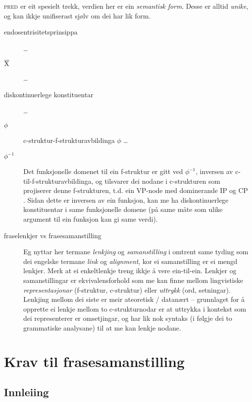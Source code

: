 \documentclass[11pt,a4paper,oneside,draft]{book}
\newcommand{\xbar}{$\rm\overline{X}$}
\newcommand{\F}[2]{\textsc{#1}\ensuremath{_{#2}}}
\newcommand{\PRED}{\F{pred}{}}
\begin{document}
 \PRED{} er eit spesielt trekk, verdien her er ein \emph{semantisk  form}. Desse er alltid \emph{unike}, og kan ikkje unifiserast sjølv om dei
 har lik form.

\begin{description}
\item [endosentrisitetsprinsippa] \ldots{}
\item [\xbar] \ldots{}
\item [diskontinuerlege konstituentar] \ldots{}
\item [$\phi$] c-struktur-f-strukturavbildinga $\phi$ \ldots{}
\item [$\phi^{-1}$] Det funksjonelle domenet til ein f-struktur er gitt
  ved $\phi^{-1}$, inversen av c-til-f-strukturavbildinga, og
  tilsvarer dei nodane i c-strukturen som projiserer denne
  f-strukturen, t.d. ein VP-node med dominerande IP og CP
  \citep[s.~126]{bresnan2001lfs}. Sidan dette er inversen av ein
  funksjon, kan me ha diskontinuerlege konstituentar i same
  funksjonelle domene (på same måte som ulike argument til ein
  funksjon kan gi same verdi).
\item [fraselenkjer vs frasesamanstilling] Eg nyttar her termane
  \emph{lenkjing} og \emph{samanstilling} i omtrent same tyding som dei engelske
  termane \emph{link} og \emph{alignment}, kor ei samanstilling er ei mengd
  lenkjer. Merk at ei enkeltlenkje treng ikkje å vere ein-til-ein.
  Lenkjer og samanstillingar er ekvivalensforhold som me kan finne
  mellom lingvistiske \emph{representasjonar} (f-struktur, c-struktur)
  eller \emph{uttrykk} (ord, setningar). Lenkjing mellom dei siste er meir
  ateoretisk / datanært -- grunnlaget for å opprette ei lenkje mellom
  to c-strukturnodar er at uttrykka i kontekst som dei representerer
  er omsetjingar, og har lik nok syntaks (i følgje dei to grammatiske
  analysane) til at me kan lenkje nodane.
\end{description}
\chapter{Krav til frasesamanstilling}
\label{sec-3}

\label{SEC:ideell}

\section{Innleiing}
\label{sec-3.1}
\end{document}
